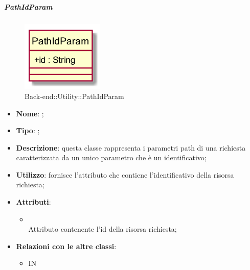\hypertarget{PathIdParam_label}{\subparagraph{PathIdParam}}
\begin{figure}[h]
	\centering
	\includegraphics[width=0.35\textwidth,height=\textheight,keepaspectratio]{images/ClassPathIdParam.png}
	\caption{Back-end::Utility::PathIdParam}
\end{figure}
\begin{itemize}
	\item \textbf{Nome}: ;
	\item \textbf{Tipo}: ;
	\item \textbf{Descrizione}: questa classe rappresenta i parametri path di una richiesta caratterizzata da un unico parametro che è un identificativo;
	\item \textbf{Utilizzo}: fornisce l'attributo che contiene l'identificativo della risorsa richiesta;
	\item \textbf{Attributi}:
	\begin{itemize}
		\item[]  \\
		Attributo contenente l'id della risorsa richiesta;
	\end{itemize}
	\item \textbf{Relazioni con le altre classi}:
	\begin{itemize}
		\item IN \hyperlink{LambdaIdEvent_label}{}
	\end{itemize}
\end{itemize}
\FloatBarrier

